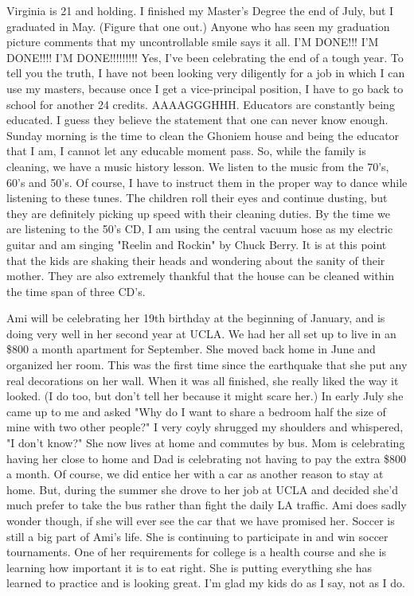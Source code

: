 Virginia is 21 and holding. I finished my Master's Degree the end of July, but I graduated in May. (Figure that one out.) Anyone who has seen my
graduation picture comments that my uncontrollable smile says it all. I'M DONE!!! I'M DONE!!!! I'M DONE!!!!!!!!!    Yes, I've been celebrating
the end of a tough year. To tell you the truth, I have not been looking very diligently for a job in which I can use my masters, because once I
get a vice-principal position, I have to go back to school for another 24 credits. AAAAGGGHHH. Educators are constantly being educated. I guess
they believe the statement that one can never know enough. Sunday morning is the time to clean the Ghoniem house and being the educator that I
am, I cannot let any educable moment pass. So, while the family is cleaning, we have a music history lesson. We listen to the music from the
70's, 60's and 50's. Of course, I have to instruct them in the proper way to dance while listening to these tunes. The children roll their eyes
and continue dusting, but they are definitely picking up speed with their cleaning duties. By the time we are listening to the 50's CD, I am
using the central vacuum hose as my electric guitar and am singing "Reelin and Rockin" by Chuck Berry. It is at this point that the kids are
shaking their heads and wondering about the sanity of their mother. They are also extremely thankful that the house can be cleaned within the
time span of three CD's.

Ami will be celebrating her 19th birthday at the beginning of January, and is doing very well in her second year at UCLA. We had her all set up
to live in an \$800 a month apartment for September. She moved back home in June and organized her room. This was the first time since the
earthquake that she put any real decorations on her wall. When it was all finished, she really liked the way it looked. (I do too, but don't
tell her because it might scare her.) In early July she came up to me and asked "Why do I want to share a bedroom half the size of mine with two
other people?" I very coyly shrugged my shoulders and whispered, "I don't know?" She now lives at home and commutes by bus. Mom is celebrating
having her close to home and Dad is celebrating not having to pay the extra \$800 a month. Of course, we did entice her with a car as another
reason to stay at home. But, during the summer she drove to her job at UCLA and decided she'd much prefer to take the bus rather than fight the
daily LA traffic. Ami does sadly wonder though, if she will ever see the car that we have promised her.   Soccer is still a big part of Ami's
life. She is continuing to participate in and win soccer tournaments. One of her requirements for college is a health course and she is learning
how important it is to eat right. She is putting everything she has learned to practice and is looking great. I'm glad my kids do as I say, not
as I do.

